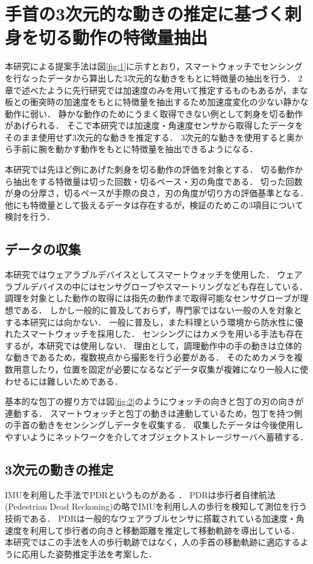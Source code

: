 \chapter{手首の3次元的な動きの推定に基づく刺身を切る動作の特徴量抽出}
本研究による提案手法は図\ref{fig:1}に示すとおり，スマートウォッチでセンシングを行なったデータから算出した3次元的な動きをもとに特徴量の抽出を行う．
2章で述べたように先行研究\cite{kumazawaanalysis}では加速度のみを用いて推定するものもあるが，まな板との衝突時の加速度をもとに特徴量を抽出するため加速度変化の少ない静かな動作に弱い．
静かな動作のためにうまく取得できない例として刺身を切る動作があげられる．
そこで本研究では加速度・角速度センサから取得したデータをそのまま使用せず3次元的な動きを推定する．
3次元的な動きを使用すると奥から手前に腕を動かす動作をもとに特徴量を抽出できるようになる．

本研究では先ほど例にあげた刺身を切る動作の評価を対象とする．
切る動作から抽出をする特徴量は切った回数・切るペース・刃の角度である．
切った回数が身の分厚さ，切るペースが手際の良さ，刃の角度が切り方の評価基準となる．
他にも特徴量として扱えるデータは存在するが，検証のためこの3項目について検討を行う．

\section{データの収集}
本研究ではウェアラブルデバイスとしてスマートウォッチを使用した．
ウェアラブルデバイスの中にはセンサグローブやスマートリングなども存在している．
調理を対象とした動作の取得には指先の動作まで取得可能なセンサグローブが理想である．
しかし一般的に普及しておらず，専門家ではない一般の人を対象とする本研究には向かない．
一般に普及し，また料理という環境から防水性に優れたスマートウォッチを採用した．
センシングにはカメラを用いる手法も存在するが，本研究では使用しない．
理由として，調理動作中の手の動きは立体的な動きであるため，複数視点から撮影を行う必要がある．
そのためカメラを複数用意したり，位置を固定が必要になるなどデータ収集が複雑になり一般人に使わせるには難しいためである．

基本的な包丁の握り方では図\ref{fig:2}のようにウォッチの向きと包丁の刃の向きが連動する．
スマートウォッチと包丁の動きは連動しているため，包丁を持つ側の手首の動きをセンシングしデータを収集する．
収集したデータは今後使用しやすいようにネットワークを介してオブジェクトストレージサーバへ蓄積する．
\section{3次元の動きの推定}
IMUを利用した手法でPDRというものがある
\cite{Trajectory Estimation Method of People in Forest Based on Inertial Sensor}
\cite{Indoor Positioning System Based on Chest-Mounted IMU}
\cite{A review of smartphones-based indoor positioning: Challenges and applications}
\cite{スマートフォンとスマートウォッチを併用したPDRによる屋内位置推定}．
PDRは歩行者自律航法(Pedestrian Dead Reckoning)の略でIMUを利用し人の歩行を検知して測位を行う技術である．
PDRは一般的なウェアラブルセンサに搭載されている加速度・角速度を利用して歩行者の向きと移動距離を推定して移動軌跡を導出している．
本研究ではこの手法を人の歩行軌跡ではなく，人の手首の移動軌跡に適応するように応用した姿勢推定手法を考案した．

